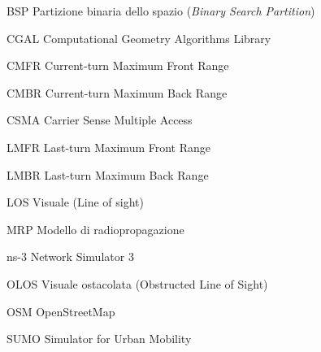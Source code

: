 \begin{abbreviations}

\item[BSP] Partizione binaria dello spazio (\textit{Binary Search Partition})
\item[CGAL] Computational Geometry Algorithms Library
\item[CMFR] Current-turn Maximum Front Range
\item[CMBR] Current-turn Maximum Back Range
\item[CSMA] Carrier Sense Multiple Access
\item[LMFR] Last-turn Maximum Front Range
\item[LMBR] Last-turn Maximum Back Range
\item[LOS] Visuale (Line of sight)
\item[MRP] Modello di radiopropagazione
\item[ns-3] Network Simulator 3
\item[OLOS] Visuale ostacolata (Obstructed Line of Sight)
\item[OSM] OpenStreetMap
\item[SUMO] Simulator for Urban Mobility

\end{abbreviations}
